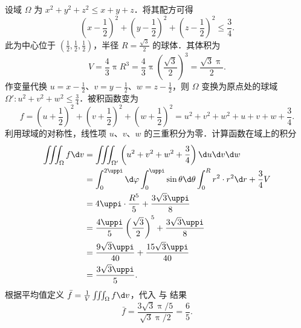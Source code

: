 \begin{solution}
    设域 $\Omega$ 为 $x^2 + y^2 + z^2 \leqslant x + y + z$．将其配方可得
    \begin{equation}\label{eq:Domain-Center-1}
        \left( x - \frac{1}{2} \right)^2 + \left( y - \frac{1}{2} \right)^2 + \left( z - \frac{1}{2} \right)^2 \leqslant \frac{3}{4}.
    \end{equation}
    此为中心位于 $(\frac{1}{2}, \frac{1}{2}, \frac{1}{2})$，半径 $R = \frac{\sqrt{3}}{2}$ 的球体．其体积为
    \begin{equation}\label{eq:Volume-1}
        V = \frac{4}{3} \uppi R^3 = \frac{4}{3} \uppi \left( \frac{\sqrt{3}}{2} \right)^3 = \frac{\sqrt{3} \uppi}{2}.
    \end{equation}
    作变量代换 $u = x - \frac{1}{2}$、$v = y - \frac{1}{2}$、$w = z - \frac{1}{2}$，则 $\Omega$ 变换为原点处的球域 $\Omega': u^2 + v^2 + w^2 \leqslant \frac{3}{4}$．被积函数变为
    \begin{equation}\label{eq:Function-Decomp-1}
        f = \left( u + \frac{1}{2} \right)^2 + \left( v + \frac{1}{2} \right)^2 + \left( w + \frac{1}{2} \right)^2 = u^2 + v^2 + w^2 + u + v + w + \frac{3}{4}.
    \end{equation}
    利用球域的对称性，线性项 $u$、$v$、$w$ 的三重积分为零．计算函数在域上的积分
    \begin{equation}\label{eq:Integral-Calculation-1}
        \begin{aligned}
            \iiint_{\Omega} f \d v & = \iiint_{\Omega'} \left( u^2 + v^2 + w^2 + \frac{3}{4} \right) \d u \d v \d w                                         \\
                                   & = \int_{0}^{2 \uppi} \d \varphi \int_{0}^{\uppi} \sin \theta \d \theta \int_{0}^{R} r^2 \cdot r^2 \d r + \frac{3}{4} V \\
                                   & = 4 \uppi \cdot \frac{R^5}{5} + \frac{3 \sqrt{3} \uppi}{8}                                                             \\
                                   & = \frac{4 \uppi}{5} \left( \frac{\sqrt{3}}{2} \right)^5 + \frac{3 \sqrt{3} \uppi}{8}                                   \\
                                   & = \frac{9 \sqrt{3} \uppi}{40} + \frac{15 \sqrt{3} \uppi}{40}                                                           \\
                                   & = \frac{3 \sqrt{3} \uppi}{5}.
        \end{aligned}
    \end{equation}
    根据平均值定义 $\bar{f} = \frac{1}{V} \iiint_{\Omega} f \d v$，代入  与  结果
    \begin{equation}
        \bar{f} = \frac{3 \sqrt{3} \uppi / 5}{\sqrt{3} \uppi / 2} = \boxed{\frac{6}{5}}.
    \end{equation}
\end{solution}

